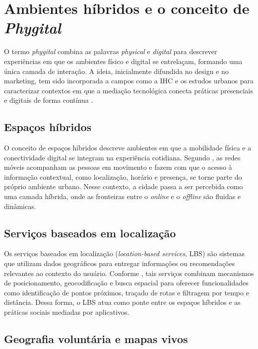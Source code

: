     \section{Ambientes híbridos e o conceito de \textit{Phygital}}

        O termo \textit{phygital} combina as palavras \textit{physical} e \textit{digital} para descrever experiências em que os ambientes físico e digital se entrelaçam, formando uma única camada de interação. A ideia, inicialmente difundida no design e no marketing, tem sido incorporada a campos como a IHC e os estudos urbanos para caracterizar contextos em que a mediação tecnológica conecta práticas presenciais e digitais de forma contínua \cite{LecavalierBardy2020,Evans2020}.

        \subsection{Espaços híbridos}

        O conceito de espaços híbridos descreve ambientes em que a mobilidade física e a conectividade digital se integram na experiência cotidiana. Segundo , as redes móveis acompanham as pessoas em movimento e fazem com que o acesso à informação contextual, como localização, horário e presença, se torne parte do próprio ambiente urbano. Nesse contexto, a cidade passa a ser percebida como uma camada híbrida, onde as fronteiras entre o \textit{online} e o \textit{offline} são fluidas e dinâmicas.

        \subsection{Serviços baseados em localização}

        Os serviços baseados em localização (\textit{location-based services}, LBS) são sistemas que utilizam dados geográficos para entregar informações ou recomendações relevantes ao contexto do usuário. Conforme , tais serviços combinam mecanismos de posicionamento, geocodificação e busca espacial para oferecer funcionalidades como identificação de pontos próximos, traçado de rotas e filtragem por tempo e distância. Dessa forma, o LBS atua como ponte entre os espaços híbridos e as práticas sociais mediadas por aplicativos.

        \subsection{Geografia voluntária e mapas vivos}

